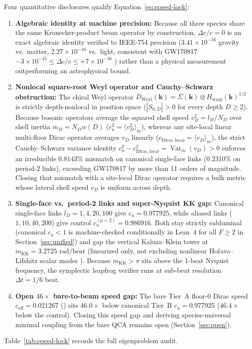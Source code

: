 Four quantitative disclosures qualify Equation~\eqref{eq:speed-lock}:
\begin{enumerate}[itemsep=2pt]
\item \textbf{Algebraic identity at machine precision:} Because all three species share the same Kronecker-product
beam operator by construction, $\Delta c / c = 0$ is an exact algebraic identity verified to IEEE-754 
precision ($3.41 \times 10^{-16}$ gravity vs.\ matter, $2.27 \times 10^{-16}$ vs.\ light, consistent with GW170817
$-3 \times 10^{-15} \le \Delta c / c \le +7 \times 10^{-16}$ \cite{abbott2017gw170817}) rather than a physical
measurement outperforming an astrophysical bound.
\item \textbf{Nonlocal square-root Weyl operator and Cauchy--Schwarz obstruction:} The chiral Weyl operator
$D_{\mathrm{Weyl}}(\mathbf{k}) = \hat{\Sigma}(\mathbf{k}) \otimes H_{\mathrm{warp}}(\mathbf{k})^{1/2}$ is strictly
depth-nonlocal in position space ($|S_{0,D}| > 0$ for every depth $D \ge 2$). Because bosonic operators average the
squared shell speed $v_D^2 = l_D / N_D$ over shell inertia $m_D = N_D w(D)$ ($c_u^2 = \langle v_D^2 \rangle_m$),
whereas any site-local linear multi-floor Dirac operator averages $v_D$ linearly
($c_{\mathrm{Dirac,local}} = \langle v_D \rangle_m$), the strict Cauchy--Schwarz variance identity
$c_u^2 - c_{\mathrm{Dirac,local}}^2 = \operatorname{Var}_m(v_D) > 0$ enforces an irreducible $0.8143\%$ mismatch on
canonical single-face links ($0.2310\%$ on period-2 links), exceeding GW170817 by more than 11 orders of magnitude.
Closing that mismatch with a site-local Dirac operator requires a bulk metric whose lateral shell speed $v_D$ is
uniform across depth.
\item \textbf{Single-face vs.\ period-2 links and super-Nyquist KK gap:} Canonical single-face links
\mbox{$l_D = 1, 4, 20, 100$} give $c_u = 0.977925$, while aliased \mbox{} links ($1, 10, 40, 200$)
give control $c_u^{(p=2)} = 0.986916$. Both stay strictly subluminal (canonical $c_u < 1$ is machine-checked
conditionally in Lean~4 for all $F \ge 2$ in Section~\ref{sec:unified}) and gap the vertical Kaluza--Klein tower at
$m_{\mathrm{KK}} = 3.2725\text{ rad/beat}$ (linearized only, not excluding nonlinear Ho\v{r}ava--Lifshitz scalar modes
\cite{horava2009}). Because $m_{\mathrm{KK}} > \pi$ sits above the 1-beat Nyquist frequency, the symplectic leapfrog
verifier runs at sub-beat resolution $\Delta t = 1/6\text{ beat}$.
\item \textbf{Open $46\times$ bare-to-beam speed gap:} The bare Tier~A floor-0 Dirac speed $c_{\mathrm{eff}} =
0.021267$ () sits $46.0\times$ below canonical Tier~B $c_u = 0.977925$ ($46.4\times$ below the
\mbox{} control). Closing this speed gap and deriving species-universal minimal coupling from the bare
QCA remains open (Section~\ref{sec:open}).
\end{enumerate}
Table~\ref{tab:speed-lock} records the full eigenproblem audit.

